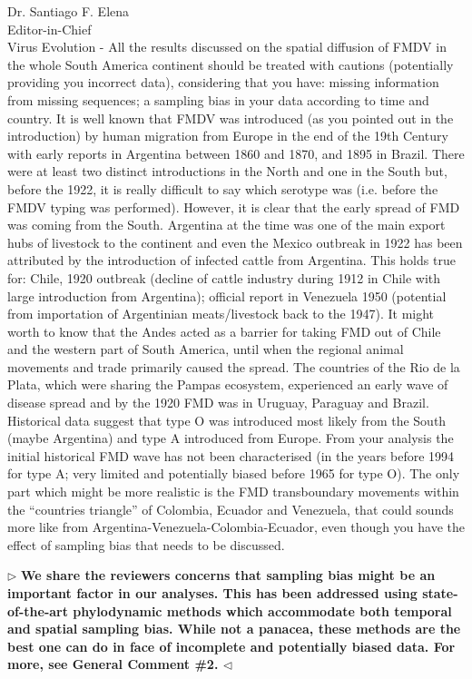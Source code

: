 \documentclass[12pt, a4paper]{letter} %
\newenvironment{reply}{$\triangleright$\bf}{$\triangleleft$}
\begin{document}
\begin{letter}{
	Dr. Santiago F. Elena\\
    Editor-in-Chief \\
    Virus Evolution
}
-       All the results discussed on the spatial diffusion of FMDV in the whole South America continent should be treated with cautions (potentially providing you incorrect data), considering that you have: missing information from missing sequences; a sampling bias in your data according to time and country. 
It is well known that FMDV was introduced (as you pointed out in the introduction) by human migration from Europe in the end of the 19th Century with early reports in Argentina between 1860 and 1870, and 1895 in Brazil. 
There were at least two distinct introductions in the North and one in the South but, before the 1922, it is really difficult to say which serotype was (i.e. before the FMDV typing was performed). 
However, it is clear that the early spread of FMD was coming from the South. 
Argentina at the time was one of the main export hubs of livestock to the continent and even the Mexico outbreak in 1922 has been attributed by the introduction of infected cattle from Argentina. 
This holds true for: Chile, 1920 outbreak (decline of cattle industry during 1912 in Chile with large introduction from Argentina); official report in Venezuela 1950 (potential from importation of Argentinian meats/livestock back to the 1947). 
It might worth to know that the Andes acted as a barrier for taking FMD out of Chile and the western part of South America, until when the regional animal movements and trade primarily caused the spread. 
The countries of the Rio de la Plata, which were sharing the Pampas ecosystem, experienced an early wave of disease spread and by the 1920 FMD was in Uruguay, Paraguay and Brazil. 
Historical data suggest that type O was introduced most likely from the South (maybe Argentina) and type A introduced from Europe. 
From your analysis the initial historical FMD wave has not been characterised (in the years before 1994 for type A; very limited and potentially biased before 1965 for type O). 
The only part which might be more realistic is the FMD transboundary movements within the ``countries triangle'' of Colombia, Ecuador and Venezuela, that could sounds more like from Argentina-Venezuela-Colombia-Ecuador, even though you have the effect of sampling bias that needs to be discussed.

\begin{reply}
We share the reviewers concerns that sampling bias might be an important factor in our analyses.
This has been addressed using state-of-the-art phylodynamic methods which accommodate both temporal and spatial sampling bias.
While not a panacea, these methods are the best one can do in face of incomplete and potentially biased data.
For more, see General Comment \#2.
\end{reply}


\end{letter}
\end{document}
